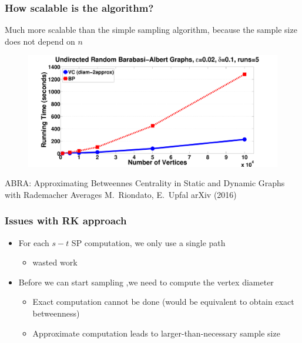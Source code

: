 \begin{frame}
  \frametitle{How scalable is the algorithm?}
  Much more scalable than the simple sampling algorithm, because the sample
  size does not depend on $n$
  \vfill
  \begin{figure}[H]
    \centering
    \includegraphics[width=\textwidth]{imgs/random-time.pdf}
  \end{figure}
\end{frame}


\begin{frame}
  \centering
  \vfill
  {\huge ABRA: Approximating Betweennes Centrality in Static and Dynamic
  Graphs with Rademacher Averages}
  \vfill
  {\large M.~Riondato, E.~Upfal}
  \vfill
  {\large arXiv (2016)}
  \vfill
\end{frame}

\begin{frame}
  \frametitle{Issues with RK approach}
  \begin{itemize}
    \item For each $s-t$ SP computation, we only use a single path
      \begin{itemize}
        \item wasted work
      \end{itemize}
      \pause
    \item Before we can start sampling ,we need to compute the vertex diameter
      \begin{itemize}
        \item Exact computation cannot be done (would be equivalent to obtain
          exact betweenness)
        \item Approximate computation leads to larger-than-necessary sample size
      \end{itemize}
      \pause
  \end{itemize}
\end{frame}

